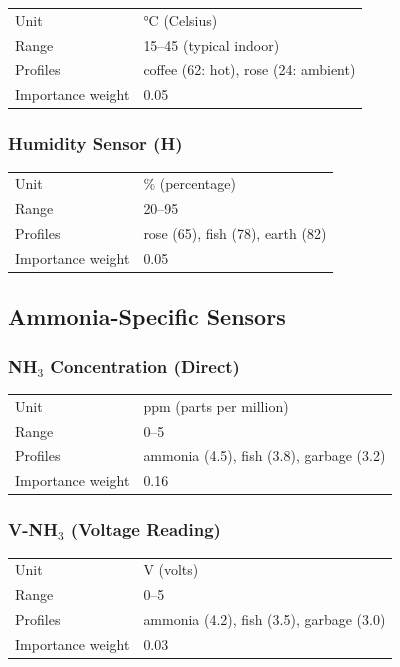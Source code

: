 \documentclass[12pt,a4paper]{article}
\begin{document}
\begin{tabular}{ll}
Unit & °C (Celsius) \\
Range & 15–45 (typical indoor) \\
Profiles & coffee (62: hot), rose (24: ambient) \\
Importance weight & 0.05 \\
\end{tabular}

\subsubsection{Humidity Sensor (H)}

\begin{tabular}{ll}
Unit & \% (percentage) \\
Range & 20–95 \\
Profiles & rose (65), fish (78), earth (82) \\
Importance weight & 0.05 \\
\end{tabular}

\subsection{Ammonia-Specific Sensors}

\subsubsection{NH$_3$ Concentration (Direct)}

\begin{tabular}{ll}
Unit & ppm (parts per million) \\
Range & 0–5 \\
Profiles & ammonia (4.5), fish (3.8), garbage (3.2) \\
Importance weight & 0.16 \\
\end{tabular}

\subsubsection{V-NH$_3$ (Voltage Reading)}

\begin{tabular}{ll}
Unit & V (volts) \\
Range & 0–5 \\
Profiles & ammonia (4.2), fish (3.5), garbage (3.0) \\
Importance weight & 0.03 \\
\end{tabular}
\end{document}
